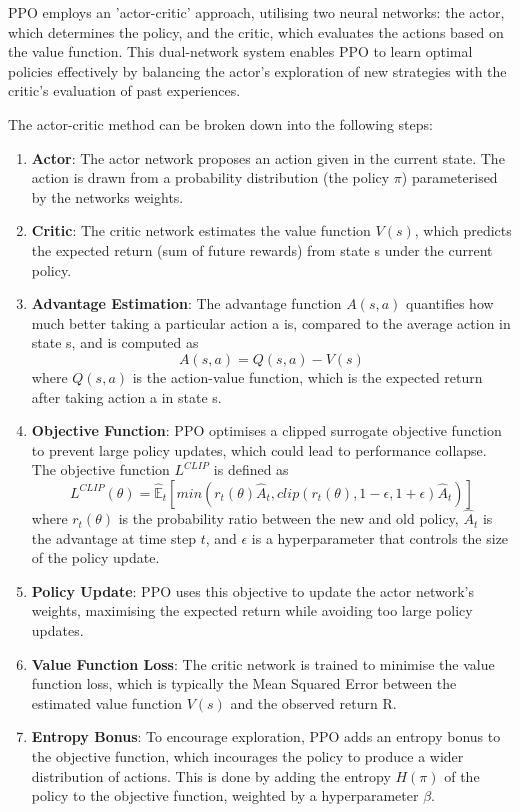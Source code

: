 PPO employs an 'actor-critic' approach, utilising two neural networks: the actor, which determines the policy, and the critic, which evaluates the actions based on the value function. This dual-network system enables PPO to learn optimal policies effectively by balancing the actor's exploration of new strategies with the critic's evaluation of past experiences.

The actor-critic method can be broken down into the following steps:
\begin{enumerate}
    \item \textbf{Actor}: The actor network proposes an action given in the current state. The action is drawn from a probability distribution (the policy $\pi$) parameterised by the networks weights.
    \item \textbf{Critic}: The critic network estimates the value function $V(s)$, which predicts the expected return (sum of future rewards) from state s under the current policy.
    \item \textbf{Advantage Estimation}: The advantage function $A(s,a)$ quantifies how much better taking a particular action a is, compared to the average action in state s, and is computed as 
    \begin{equation}
        A(s,a) = Q(s,a) - V(s)
    \end{equation}
    where $Q(s,a)$ is the action-value function, which is the expected return after taking action a in state s.
    \item \textbf{Objective Function}:  PPO optimises a clipped surrogate objective function to prevent large policy updates, which could lead to performance collapse. The objective function $L^{CLIP}$ is defined as
    \begin{equation}
        L^{CLIP}(\theta) = \hat{\mathbb{E}}_t[min(r_t(\theta)\hat{A}_t, clip(r_t(\theta), 1-\epsilon, 1+\epsilon)\hat{A}_t)]
    \end{equation}
    where $r_t(\theta)$ is the probability ratio between the new and old policy, $\hat{A}_t$ is the advantage at time step $t$, and $\epsilon$ is a hyperparameter that controls the size of the policy update.
    \item \textbf{Policy Update}: PPO uses this objective to update the actor network's weights, maximising the expected return while avoiding too large policy updates.
    \item \textbf{Value Function Loss}: The critic network is trained to minimise the value function loss, which is typically the Mean Squared Error between the estimated value function $V(s)$ and the observed return R.
    \item \textbf{Entropy Bonus}: To encourage exploration, PPO adds an entropy bonus to the objective function, which incourages the policy to produce a wider distribution of actions. This is done by adding the entropy $H(\pi)$ of the policy to the objective function, weighted by a hyperparameter $\beta$.
\end{enumerate}

